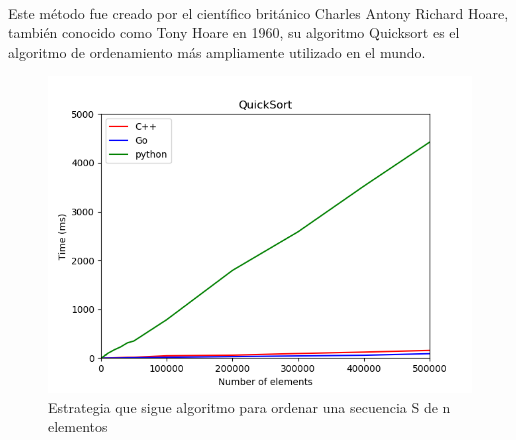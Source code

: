 \documentclass{article}
\begin{document}
        \paragraph {}
        Este método fue creado por el científico británico Charles Antony Richard Hoare, también conocido como Tony Hoare en 1960, su algoritmo Quicksort es el algoritmo de ordenamiento más ampliamente utilizado en el mundo.
           \begin{figure}[h!]
            \centering
            \includegraphics[width=12cm]{img/QuickSort_1.png}
            \caption{Estrategia que sigue algoritmo para ordenar una secuencia S de n elementos}
            \label{fig:mergesort}
        \end {figure}
    
\end{document}
